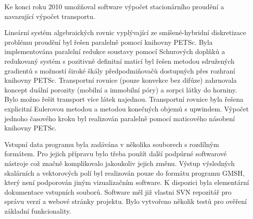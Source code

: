 \documentclass[11pt]{report}
\begin{document}
Ke konci roku 2010 umožňoval software výpočet stacionárního proudění a 
navazující výpočet transportu. 

Lineární systém algebraických rovnic vyplývající 
ze smíšené-hybridní diskretizace problému proudění byl řešen paralelně pomocí 
knihovny PETSc. Byla implementována paralelní redukce soustavy pomocí 
Schurových doplňků a redukovaný systém s pozitivně definitní maticí byl řešen 
metodou sdružených gradientů s možností široké škály předpodmiňovačů dostupných 
přes rozhraní knihovny PETSc. Transportní rovnice (pouze konvekce bez difúze) 
zahrnovala koncept duální porozity (mobilní a immobilní póry) a sorpci látky 
do horniny. Bylo možno řešit transport více látek najednou. Transportní rovnice 
byla řešena explicitní Eulerovou metodou a metodou konečných objemů s upwindem.  
Výpočet jednoho časového kroku byl realizován paralelně pomocí maticového 
násobení knihovny PETSc. 

Vstupní data programu byla zadávána v několika 
souborech s rozdílným formátem. Pro jejich přípravu bylo třeba použít 
další podpůrné softwarové nástroje což značně komplikovalo jakoukoliv 
jejich změnu. Výstup výsledných skalárních a vektorových 
polí byl realizován pouze do formátu programu GMSH, který není podporován jiným 
vizualizačním software. K dispozici byla elementární dokumentace vstupních 
souborů. Software měl již vlastni SVN repozitář pro správu verzí a webové 
stránky projektu. Bylo vytvořeno několik testů pro ověření základní 
funkcionality. 
\end{document}
